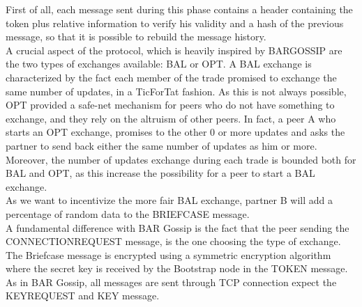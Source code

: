 \documentclass[mscthesis]{usiinfthesis}
\begin{document}
First of all, each message sent during this phase contains a header containing the token plus relative information to verify his validity and a hash of the previous message, so that it is possible to rebuild the message history. \\
A crucial aspect of the protocol, which is heavily inspired by BARGOSSIP  are the two types of exchanges available: BAL or OPT. A BAL exchange is characterized by the fact each member of the trade promised to exchange the same number of updates, in a TicForTat fashion. As this is not always possible, OPT provided a safe-net mechanism for peers who do not have something to exchange, and they rely on the altruism of other peers. In fact, a peer A who starts an OPT exchange, promises to the other 0 or more updates and asks the partner to send back either the same number of updates as him or more. Moreover, the number of updates exchange during each trade is bounded both for BAL and OPT, as this increase the possibility for a peer to start a BAL exchange. \\
As we want to incentivize the more fair BAL exchange, partner B will add a percentage of random data to the BRIEFCASE message.  \\
A fundamental difference with BAR Gossip is the fact that the peer sending the CONNECTIONREQUEST message, is the one choosing the type of exchange.  \\
The Briefcase message is encrypted using a symmetric encryption algorithm where the secret key is received by the Bootstrap node in the TOKEN message. \\
As in BAR Gossip, all messages are sent through TCP connection expect the KEYREQUEST and KEY message.

\begin{table}[H]
\centering
{}
\caption{Header description}
\label{tab:header-bar-message}
\end{table}
\end{document}
